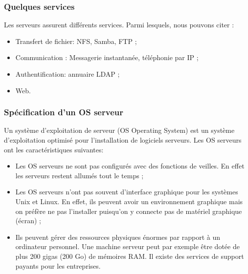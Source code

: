 \documentclass[a4paper,12pt,french]{report} %
\begin{document}
\subsubsection{Quelques services}
Les serveurs assurent différents services. Parmi lesquels, nous pouvons citer :
\begin{itemize}
\item Transfert de fichier: NFS, Samba, FTP ;
\item Communication : Messagerie instantanée, téléphonie par IP ;
\item Authentification: annuaire LDAP ;
\item Web.
\end{itemize}

\subsubsection{Spécification d'un OS serveur}
	Un système d'exploitation de serveur (OS Operating System) est un système d'exploitation optimisé pour l'installation de logiciels serveurs. Les OS serveurs ont les caractéristiques suivantes:
\begin{itemize}
	\item Les OS serveurs ne sont pas configurés avec des fonctions de veilles. En effet les serveurs restent allumés tout le temps ;
	\item Les OS serveurs n'ont pas souvent d'interface graphique pour les systèmes Unix et Linux. En effet, ils peuvent avoir un environnement graphique mais on préfère ne pas l'installer puisqu'on y connecte pas de matériel graphique (écran) ;
	\item Ils peuvent gérer des ressources physiques énormes par rapport à un ordinateur personnel. Une machine serveur peut par exemple être dotée de plus 200 gigas (200 Go) de mémoires RAM. Il existe des services de support payants pour les entreprises.
\end{itemize} 
	
\end{document}
